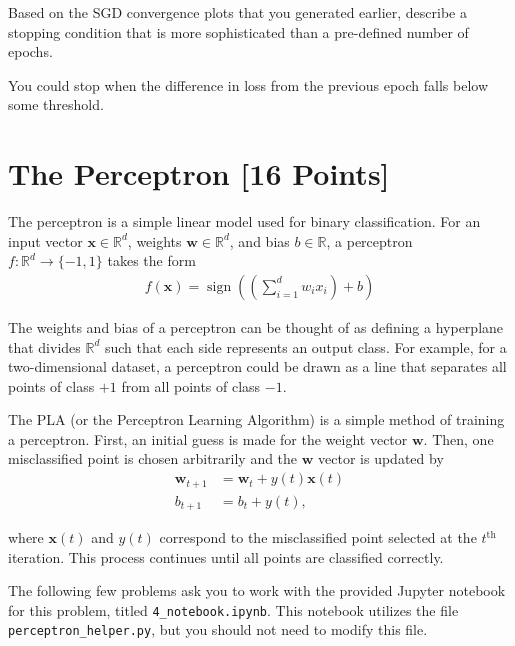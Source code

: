 \begin{problem}[2]
  Based on the SGD convergence plots that you generated earlier, describe a stopping condition that is more sophisticated than a pre-defined number of epochs.
\end{problem}
\begin{solution}
  You could stop when the difference in loss from the previous epoch falls below some threshold.
\end{solution}



\newpage
\section{The Perceptron [16 Points]}

The perceptron is a simple linear model used for binary classification. For an input vector $\mathbf{x} \in \mathbb{R}^d$, weights $\mathbf{w} \in \mathbb{R}^d$, and bias $b \in \mathbb{R}$, a perceptron $f: \mathbb{R}^d \rightarrow \{-1,1\}$ takes the form
\begin{align*}
  f(\mathbf{x}) = \operatorname{sign}\left(\left(\sum_{i=1}^d w_i x_i\right) + b \right)
\end{align*}

The weights and bias of a perceptron can be thought of as defining a hyperplane that divides $\mathbb{R}^d$ such that each side represents an output class. For example, for a two-dimensional dataset, a perceptron could be drawn as a line that separates all points of class $+1$ from all points of class $-1$.

The PLA (or the Perceptron Learning Algorithm) is a simple method of training a perceptron. First, an initial guess is made for the weight vector $\mathbf{w}$. Then, one misclassified point is chosen arbitrarily and the $\mathbf{w}$ vector is updated by
\begin{align*}
  \mathbf{w}_{t+1} &= \mathbf{w}_t + y(t)\mathbf{x}(t) \\
  b_{t + 1} &= b_t + y(t),
\end{align*}

where $\mathbf{x}(t)$ and $y(t)$ correspond to the misclassified point selected at the $t^\text{th}$ iteration.
This process continues until all points are classified correctly.

The following few problems ask you to work with the provided Jupyter notebook for this problem, titled \texttt{4_notebook.ipynb}. This notebook utilizes the file \texttt{perceptron_helper.py}, but you should not need to modify this file.

